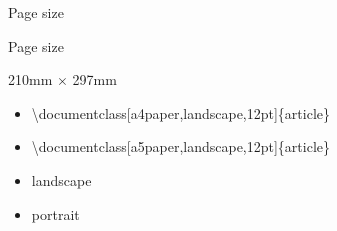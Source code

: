 \documentclass[ aspectratio=149,  14pt,blue,xcolor=pdftex,dvipsnames,table,handout,notes]{beamer}
\begin{document}
		\begin{frame}[c]{Page size}


			\begin{block} {Page size}
			\begin{description}[12345678901234567890]
			\item	[a4paper] 210mm $\times$ 297mm
			\item	[a5paper]
			\item	[b5paper]
			\item	[letterpaper]
			\item	[legalpaper]
			\item	[executivepaper]
			\end{description}
			\end{block}


			\begin{example}
			\begin{itemize}
			\item[]	\textbackslash documentclass[a4paper,landscape,12pt]\{article\}
			\item[]	\textbackslash documentclass[a5paper,landscape,12pt]\{article\}
			\end{itemize}
			\end{example}

			\begin{itemize}
			\item[]	landscape
			\item[]	portrait
			\end{itemize}


		\end{frame}
\end{document}
